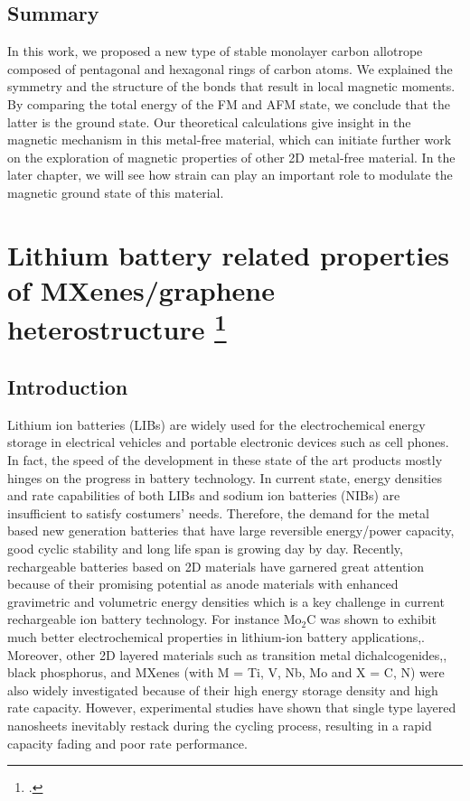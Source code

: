 \subsection{Summary}
In this work, we proposed a new type of stable monolayer carbon allotrope composed of pentagonal and hexagonal rings of carbon atoms. We explained the symmetry and the structure of the bonds that result in local magnetic moments. By comparing the total energy of the FM and AFM state, we conclude that the latter is the ground state. Our theoretical calculations give insight in the magnetic mechanism in this metal-free material, which can initiate further work on the exploration of magnetic properties of other 2D metal-free material. In the later chapter, we will see how strain can play an important role to modulate the magnetic ground state of this material.


\section[Lithium battery related properties of MXenes/graphene heterostructure]{Lithium battery related properties of MXenes/graphene heterostructure \footcite[This work will be published as:][]{Aierken2017.battery}}

\subsection{Introduction}
Lithium ion batteries (LIBs) are widely used for the electrochemical energy storage in electrical vehicles and portable electronic devices such as cell phones. In fact, the speed of the development in these state of the art products mostly hinges on the progress in battery technology. In current state, energy densities and rate capabilities of both LIBs and sodium ion batteries (NIBs) are insufficient to satisfy costumers' needs. Therefore, the demand for the metal based new generation batteries that have large reversible energy/power capacity, good cyclic stability and long life span is growing day by day. Recently, rechargeable batteries based on 2D materials have garnered great attention because of their promising potential as anode materials with enhanced gravimetric and volumetric energy densities which is a key challenge in current rechargeable ion battery technology. For instance Mo$_2$C was shown to exhibit much better electrochemical properties in lithium-ion battery applications,\cite{mo2c-ref8, mo2c-ref10}. Moreover, other 2D layered materials such as transition metal dichalcogenides,\cite{mo2c-ref11, mo2c-ref12}, black phosphorus\cite{mo2c-ref18, mo2c-ref20}, and MXenes (with M = Ti, V, Nb, Mo and X = C, N)\cite{mo2c-ref13, mo2c-ref17} were also widely investigated because of their high energy storage density and high rate capacity. However, experimental studies have shown that single type layered nanosheets inevitably restack during the cycling process, resulting in a rapid capacity fading and poor rate performance. 


